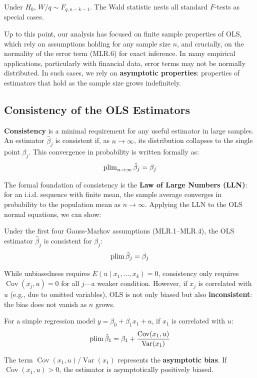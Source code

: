 Under $H_0$, $W/q \sim F_{q, n-k-1}$. The Wald statistic nests all standard $F$-tests as special cases.


Up to this point, our analysis has focused on finite sample properties of OLS, which rely on assumptions holding for any sample size $n$, and crucially, on the normality of the error term (MLR.6) for exact inference. In many empirical applications, particularly with financial data, error terms may not be normally distributed. In such cases, we rely on \textbf{asymptotic properties}: properties of estimators that hold as the sample size grows indefinitely.
\subsection{Consistency of the OLS Estimators}

\textbf{Consistency} is a minimal requirement for any useful estimator in large samples. An estimator $\hat{\beta}_j$ is consistent if, as $n \to \infty$, its distribution collapses to the single point $\beta_j$. This convergence in probability is written formally as:
$$\operatorname{plim}_{n \to \infty} \hat{\beta}_j = \beta_j$$

The formal foundation of consistency is the \textbf{Law of Large Numbers (LLN)}: for an i.i.d. sequence with finite mean, the sample average converges in probability to the population mean as $n \to \infty$. Applying the LLN to the OLS normal equations, we can show:

\begin{theorem}
Under the first four Gauss-Markov assumptions (MLR.1--MLR.4), the OLS estimator $\hat{\beta}_j$ is consistent for $\beta_j$:
$$\operatorname{plim} \hat{\beta}_j = \beta_j$$
\end{theorem}

While unbiasedness requires $E(u \mid x_1, \ldots, x_k) = 0$, consistency only requires $\operatorname{Cov}(x_j, u) = 0$ for all $j$---a weaker condition. However, if $x_j$ is correlated with $u$ (e.g., due to omitted variables), OLS is not only biased but also \textbf{inconsistent}: the bias does not vanish as $n$ grows.

For a simple regression model $y = \beta_0 + \beta_1 x_1 + u$, if $x_1$ is correlated with $u$:
$$\operatorname{plim} \hat{\beta}_1 = \beta_1 + \frac{\operatorname{Cov}(x_1, u)}{\operatorname{Var}(x_1)}$$

The term $\operatorname{Cov}(x_1, u)/\operatorname{Var}(x_1)$ represents the \textbf{asymptotic bias}. If $\operatorname{Cov}(x_1, u) > 0$, the estimator is asymptotically positively biased.
